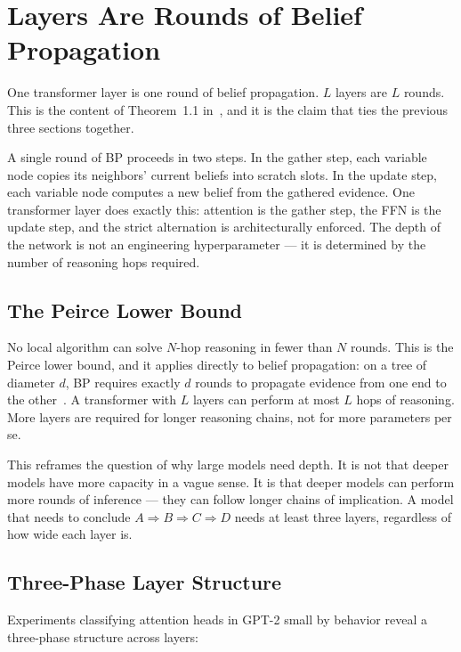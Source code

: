 \section{Layers Are Rounds of Belief Propagation}
\label{sec:layers-rounds}

One transformer layer is one round of belief propagation. $L$ layers are $L$ rounds.
This is the content of Theorem~1.1 in~\cite{coppola2026transformers}, and it is the
claim that ties the previous three sections together.

A single round of BP proceeds in two steps. In the gather step, each variable node
copies its neighbors' current beliefs into scratch slots. In the update step, each
variable node computes a new belief from the gathered evidence. One transformer
layer does exactly this: attention is the gather step, the FFN is the update step,
and the strict alternation is architecturally enforced. The depth of the network is
not an engineering hyperparameter --- it is determined by the number of reasoning
hops required.

\subsection*{The Peirce Lower Bound}

No local algorithm can solve $N$-hop reasoning in fewer than $N$ rounds. This is
the Peirce lower bound, and it applies directly to belief propagation: on a tree of
diameter $d$, BP requires exactly $d$ rounds to propagate evidence from one end to
the other~\cite{pearl1988probabilistic}. A transformer with $L$ layers can perform
at most $L$ hops of reasoning. More layers are required for longer reasoning chains,
not for more parameters per se.

This reframes the question of why large models need depth. It is not that deeper
models have more capacity in a vague sense. It is that deeper models can perform
more rounds of inference --- they can follow longer chains of implication. A model
that needs to conclude $A \Rightarrow B \Rightarrow C \Rightarrow D$ needs at least
three layers, regardless of how wide each layer is.

\subsection*{Three-Phase Layer Structure}

Experiments classifying attention heads in GPT-2 small by behavior reveal a
three-phase structure across layers:


